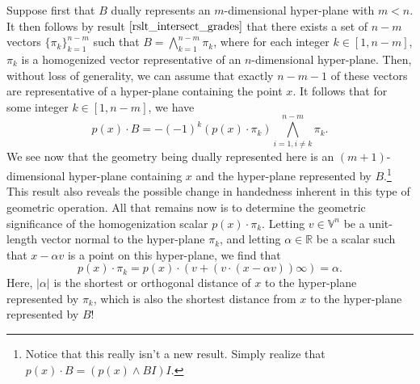\documentclass[12pt]{article}
\newcommand{\V}{\mathbb{V}}
\newcommand{\R}{\mathbb{R}}
\newcommand{\nvai}{\infty}
\begin{document}
Suppose first that $B$ dually represents an $m$-dimensional
hyper-plane with $m<n$.  It then follows by result $\eqref{rslt_intersect_grades}$
that there exists a set of $n-m$ vectors $\{\pi_k\}_{k=1}^{n-m}$
such that $B=\bigwedge_{k=1}^{n-m}\pi_k$, where for each integer
$k\in[1,n-m]$, $\pi_k$ is a homogenized vector representative
of an $n$-dimensional hyper-plane.  Then, without loss of generality,
we can assume that exactly $n-m-1$ of these vectors are representative
of a hyper-plane containing the point $x$.
It follows that for some integer $k\in[1,n-m]$, we have
\begin{equation*}
p(x)\cdot B = -(-1)^k (p(x)\cdot \pi_k)\bigwedge_{i=1,i\neq k}^{n-m} \pi_k.
\end{equation*}
We see now that the geometry being dually represented here is an
$(m+1)$-dimensional hyper-plane containing $x$ and
the hyper-plane represented by $B$.\footnote{Notice that this really isn't a new result.
Simply realize that $p(x)\cdot B = (p(x)\wedge BI)I$.}
This result also reveals the possible
change in handedness inherent in this type of geometric operation.  All that remains now is to determine
the geometric significance of the homogenization scalar $p(x)\cdot\pi_k$.
Letting $v\in\V^n$ be a unit-length vector
normal to the hyper-plane $\pi_k$, and letting $\alpha\in\R$ be a scalar such that
$x-\alpha v$ is a point on this hyper-plane, we find that
\begin{equation*}
p(x)\cdot\pi_k = p(x)\cdot(v+(v\cdot(x-\alpha v))\nvai) = \alpha.
\end{equation*}
Here, $|\alpha|$ is the shortest or orthogonal distance
of $x$ to the hyper-plane represented by $\pi_k$, which is also the shortest distance
from $x$ to the hyper-plane represented by $B$!
\end{document}
